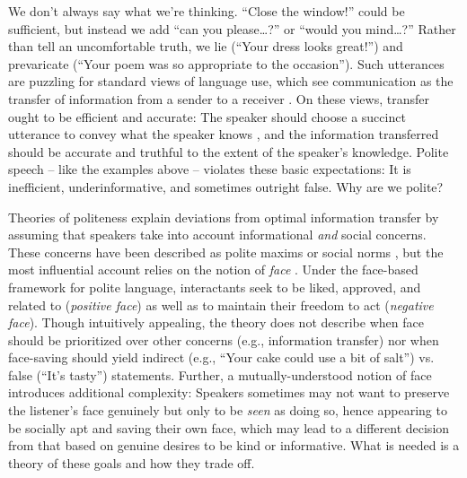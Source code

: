 \documentclass[12pt]{article}
\begin{document}
We don't always say what we're thinking. \enquote{Close the
window!} could be sufficient, but instead we add \enquote{can you please\ldots{}?}
or \enquote{would you mind\ldots{}?}
Rather than tell an
uncomfortable truth, we lie (\enquote{Your dress looks great!}) and
prevaricate (\enquote{Your poem was so appropriate to the occasion}).
Such utterances are puzzling for standard views of language use, which
see communication as the transfer of information from a sender to a
receiver \cite{buhler1934, shannon1948, jakobson1960, frank2012}. On these views, transfer ought to be efficient and
accurate: The speaker should choose a succinct utterance  to convey
what the speaker knows \cite{grice1975, searle1975},
and the information transferred should be accurate and truthful
to the extent of the speaker's knowledge. Polite speech --
like the examples above -- violates these basic expectations: It is inefficient,
underinformative, and sometimes outright false. Why are we
polite?

Theories of politeness explain deviations from optimal information
transfer by assuming that speakers take into account informational \emph{and} social concerns.
These concerns have been described as polite maxims \cite{leech1983} or social norms \cite{ide1989},
but the most influential account relies on the notion of \emph{face} \cite{brown1987, goffman1967}.
Under the face-based framework for polite language, interactants seek to be liked,
approved, and related to (\emph{positive face}) as well as to maintain
their freedom to act (\emph{negative face}).
Though intuitively appealing, the theory does not describe when face should be prioritized over other concerns (e.g., information transfer) nor when face-saving should yield indirect (e.g., \enquote{Your cake could use a bit of salt}) vs. false (\enquote{It's tasty}) statements.
Further, a mutually-understood notion of face introduces additional complexity: Speakers sometimes may not want to preserve the listener's face genuinely but only to be \emph{seen} as doing so, hence appearing to be socially apt and saving their own face, which may lead to a different decision from that based on genuine desires to be kind or informative.
What is needed is a theory of these goals and how they trade off.

\end{document}
